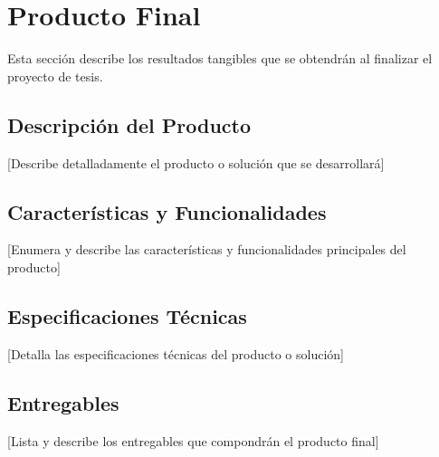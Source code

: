 \section{Producto Final}

Esta sección describe los resultados tangibles que se obtendrán al finalizar el proyecto de tesis.

\subsection{Descripción del Producto}
[Describe detalladamente el producto o solución que se desarrollará]

\subsection{Características y Funcionalidades}
[Enumera y describe las características y funcionalidades principales del producto]

\subsection{Especificaciones Técnicas}
[Detalla las especificaciones técnicas del producto o solución]

\subsection{Entregables}
[Lista y describe los entregables que compondrán el producto final]